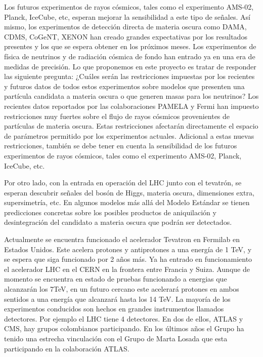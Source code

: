 \documentclass[11pt]{article}
\begin{document}
Los futuros experimentos de rayos cósmicos, tales como el experimento AMS-02, Planck, IceCube, etc, esperan mejorar la sensibilidad a este tipo de señales. Así mismo, los experimentos de detección directa de materia oscura como DAMA, CDMS, CoGeNT, XENON han creado grandes expectativas por los resultados presentes y los que se espera obtener en los próximos meses. Los experimentos de física de neutrinos y de radiación cósmica de fondo han entrado ya en una era de medidas de precisión.
Lo que proponemos en este proyecto es tratar de responder las siguiente pregunta: ¿Cuáles serán las restricciones impuestas por los recientes y futuros datos de todos estos experimentos sobre  modelos que presenten una partícula candidata a materia oscura o que generen masas para los neutrinos?
Los recientes datos reportados por las colaboraciones PAMELA y Fermi han impuesto restricciones muy fuertes sobre el flujo de rayos cósmicos provenientes de partículas de materia oscura. Estas restricciones afectarán directamente el espacio de parámetros permitido por los experimentos actuales. Adicional a estas nuevas restricciones, también se debe tener en cuenta la sensibilidad de los futuros experimentos de rayos cósmicos, tales como el experimento AMS-02, Planck, IceCube, etc.

Por otro lado, con la entrada en operación del LHC junto con el tevatrón, se esperan descubrir señales del bosón de Higgs, materia oscura, dimensiones extra, supersimetría, etc. En algunos modelos más allá del Modelo Estándar se tienen predicciones concretas sobre los posibles productos de aniquilación y desintegración del candidato a materia oscura que podrán ser detectados.

Actualmente se encuentra funcionado el acelerador Tevatron en Fermilab en Estados Unidos. Este acelera protones y antiprotones a una energía de 1 TeV, y se espera que siga funcionado por 2 años más. Ya ha entrado en funcionamiento el acelerador LHC en el CERN en la frontera entre Francia y Suiza. Aunque de momento se encuentra en estado de pruebas funcionando a energias que alcanzarán los 7TeV, en un futuro cercano este  acelerará protones en ambos sentidos a una energía que alcanzará hasta los 14 TeV. La mayoría de los experimentos conducidos son hechos en grandes instrumentos llamados detectores. Por ejemplo el LHC tiene 4 detectores. En dos de ellos, ATLAS y CMS, hay grupos colombianos participando. En los últimos años el Grupo ha tenido una estrecha vinculación con el Grupo de Marta Losada que esta participando en la colaboración ATLAS.
\end{document}

